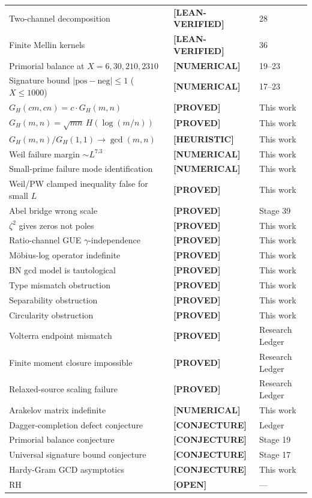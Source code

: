 \documentclass[11pt]{article}
\theoremstyle{remark}
\newcommand{\LEANVERIFIED}{\textbf{\color{green!60!black}[LEAN-VERIFIED]}}
\newcommand{\PROVED}{\textbf{\color{blue}[PROVED]}}
\newcommand{\NUMERICAL}{\textbf{\color{orange}[NUMERICAL]}}
\newcommand{\HEURISTIC}{\textbf{\color{orange!80!black}[HEURISTIC]}}
\newcommand{\OPEN}{\textbf{\color{purple}[OPEN]}}
\newcommand{\CONJECTURE}{\textbf{\color{violet}[CONJECTURE]}}
\begin{document}
\begin{longtable}{p{8cm}ll}
Two-channel decomposition & \LEANVERIFIED{} & 28 \\
Finite Mellin kernels & \LEANVERIFIED{} & 36 \\
Primorial balance at $X=6,30,210,2310$ & \NUMERICAL{} & 19--23 \\
Signature bound $|\text{pos}-\text{neg}| \leq 1$ ($X \leq 1000$) & \NUMERICAL{} & 17--23 \\
\midrule
$G_H(cm,cn) = c \cdot G_H(m,n)$ & \PROVED{} & This work \\
$G_H(m,n) = \sqrt{mn}\,H(\log(m/n))$ & \PROVED{} & This work \\
$G_H(m,n)/G_H(1,1) \to \gcd(m,n)$ & \HEURISTIC{} & This work \\
Weil failure margin $\sim L^{7.3}$ & \NUMERICAL{} & This work \\
Small-prime failure mode identification & \NUMERICAL{} & This work \\
Weil/PW clamped inequality false for small $L$ & \PROVED{} & This work \\
Abel bridge wrong scale & \PROVED{} & Stage 39 \\
$\zeta^2$ gives zeros not poles & \PROVED{} & This work \\
Ratio-channel GUE $\gamma$-independence & \PROVED{} & This work \\
M\"obius-log operator indefinite & \PROVED{} & This work \\
BN gcd model is tautological & \PROVED{} & This work \\
Type mismatch obstruction & \PROVED{} & This work \\
Separability obstruction & \PROVED{} & This work \\
Circularity obstruction & \PROVED{} & This work \\
Volterra endpoint mismatch & \PROVED{} & Research Ledger \\
Finite moment closure impossible & \PROVED{} & Research Ledger \\
Relaxed-source scaling failure & \PROVED{} & Research Ledger \\
Arakelov matrix indefinite & \NUMERICAL{} & This work \\
\midrule
Dagger-completion defect conjecture & \CONJECTURE{} & Ledger \\
Primorial balance conjecture & \CONJECTURE{} & Stage 19 \\
Universal signature bound conjecture & \CONJECTURE{} & Stage 17 \\
Hardy-Gram GCD asymptotics & \CONJECTURE{} & This work \\
\midrule
RH & \OPEN{} & --- \\
\bottomrule
\end{longtable}
\end{document}

